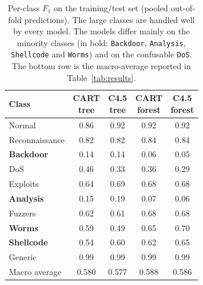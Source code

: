 \documentclass[conference]{IEEEtran}
\begin{document}
\begin{table}[t]
\centering
\footnotesize
\setlength{\tabcolsep}{4pt}
\caption{Per-class $F_1$ on the training/test set (pooled out-of-fold predictions). The large classes
are handled well by every model. The models differ mainly on the minority classes (in bold: \texttt{Backdoor},
\texttt{Analysis}, \texttt{Shellcode} and \texttt{Worms}) and on the confusable \texttt{DoS}. The
bottom row is the macro-average reported in Table~\ref{tab:results}.}
\label{tab:perclassf1}
\begin{tabular}{lcccc}
\toprule
Class & \shortstack{CART\\tree} & \shortstack{C4.5\\tree} & \shortstack{CART\\forest} & \shortstack{C4.5\\forest} \\
\midrule
Normal         & 0.86 & 0.92 & 0.92 & 0.92 \\
Reconnaissance & 0.82 & 0.82 & 0.84 & 0.84 \\
\textbf{Backdoor}       & 0.14 & 0.14 & 0.06 & 0.05 \\
DoS            & 0.46 & 0.33 & 0.36 & 0.29 \\
Exploits       & 0.64 & 0.69 & 0.68 & 0.68 \\
\textbf{Analysis}       & 0.15 & 0.19 & 0.07 & 0.06 \\
Fuzzers        & 0.62 & 0.61 & 0.68 & 0.68 \\
\textbf{Worms}          & 0.59 & 0.49 & 0.65 & 0.70 \\
\textbf{Shellcode}      & 0.54 & 0.60 & 0.62 & 0.65 \\
Generic        & 0.99 & 0.99 & 0.99 & 0.99 \\
\midrule
Macro average  & 0.580 & 0.577 & 0.588 & 0.586 \\
\bottomrule
\end{tabular}
\end{table}
\end{document}
